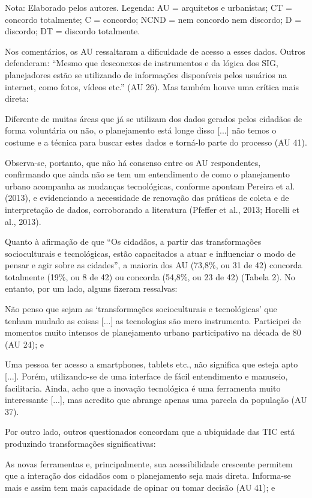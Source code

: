 \documentclass{article}
\begin{document}
Nota: Elaborado pelos autores. Legenda: AU = arquitetos e urbanistas;
CT = concordo totalmente; C = concordo; NCND = nem concordo nem
discordo; D = discordo; DT = discordo totalmente.

Nos comentários, os AU ressaltaram a dificuldade de acesso a esses dados. Outros
defenderam: “Mesmo que desconexos de instrumentos e da lógica dos SIG,
planejadores estão se utilizando de informações disponíveis pelos usuários
na internet, como fotos, vídeos etc.” (AU 26). Mas também houve uma
crítica mais direta:

Diferente de muitas áreas que já se utilizam dos dados gerados pelos cidadãos
de forma voluntária ou não, o planejamento está longe disso
[...] não temos o costume e a técnica para buscar estes
dados e torná-lo parte do processo (AU 41).

Observa-se, portanto, que não há consenso entre os AU respondentes, confirmando
que ainda não se tem um entendimento de como o planejamento urbano acompanha as
mudanças tecnológicas, conforme apontam Pereira
et al. (2013), e evidenciando a necessidade de renovação das práticas
de coleta e de interpretação de dados, corroborando a literatura (Pfeffer et
al., 2013; Horelli et al., 2013).

Quanto à afirmação de que “Os cidadãos, a partir das transformações
socioculturais e tecnológicas, estão capacitados a atuar e influenciar o
modo de pensar e agir sobre as cidades”, a maioria dos AU (73,8\%,
ou 31 de 42) concorda totalmente (19\%, ou 8 de 42) ou concorda (54,8\%, ou 23
de
42) (Tabela 2). No entanto, por um lado,
alguns fizeram ressalvas:

Não penso que sejam as ‘transformações socioculturais e tecnológicas’ que
tenham mudado as coisas [...] as tecnologias são mero instrumento.
Participei de momentos muito intensos de planejamento urbano participativo
na década de 80 (AU 24); e

Uma pessoa ter acesso a smartphones, tablets etc., não significa que esteja
apto [...]. Porém, utilizando-se de uma interface de fácil
entendimento e manuseio, facilitaria. Ainda, acho que a inovação tecnológica
é uma ferramenta muito interessante [...], mas acredito que
abrange apenas uma parcela da população (AU 37).

Por outro lado, outros questionados concordam que a ubiquidade das TIC está
produzindo transformações significativas:

As novas ferramentas e, principalmente, sua acessibilidade crescente permitem
que a interação dos cidadãos com o planejamento seja mais direta. Informa-se
mais e assim tem mais capacidade de opinar ou tomar decisão (AU 41);
e
\end{document}
